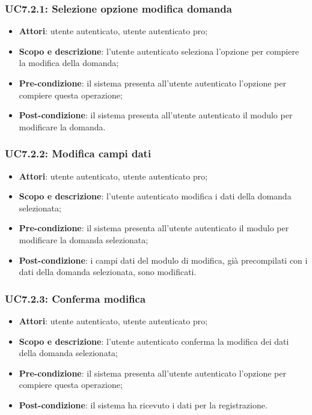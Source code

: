 	\subsubsection{UC7.2.1: Selezione opzione modifica domanda}
	\begin{itemize}
		\item
			\textbf{Attori}: utente autenticato, utente autenticato pro;
		\item
			\textbf{Scopo e descrizione}: l'utente autenticato seleziona l'opzione per compiere la modifica della domanda;
		\item		
			\textbf{Pre-condizione}: il sistema presenta all'utente autenticato l'opzione per compiere questa operazione;
		\item
			\textbf{Post-condizione}: il sistema presenta all'utente autenticato il modulo per modificare la domanda.
	\end{itemize}
	\subsubsection{UC7.2.2: Modifica campi dati}
	\begin{itemize}
		\item
			\textbf{Attori}: utente autenticato, utente autenticato pro;
		\item
			\textbf{Scopo e descrizione}: l'utente autenticato modifica i dati della domanda selezionata;
		\item		
			\textbf{Pre-condizione}: il sistema presenta all'utente autenticato il modulo per modificare la domanda selezionata;
		\item
			\textbf{Post-condizione}: i campi dati del modulo di modifica, già precompilati con i dati della domanda selezionata, sono modificati.
	\end{itemize}		
	\subsubsection{UC7.2.3: Conferma modifica}
	\begin{itemize}
		\item
			\textbf{Attori}: utente autenticato, utente autenticato pro;
		\item
			\textbf{Scopo e descrizione}: l'utente autenticato conferma la modifica dei dati della domanda selezionata;
		\item		
			\textbf{Pre-condizione}: il sistema presenta all'utente autenticato l'opzione per compiere questa operazione;
		\item
			\textbf{Post-condizione}: il sistema ha ricevuto i dati per la registrazione.
	\end{itemize}		
